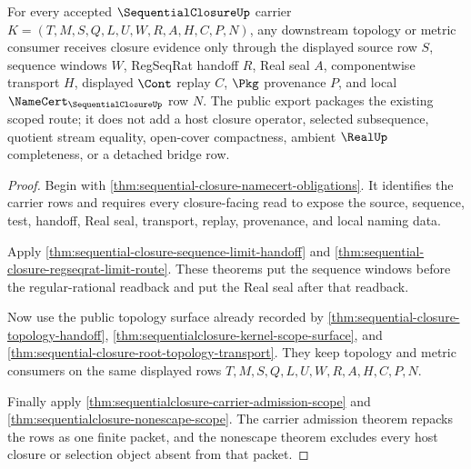 \begin{theorem}\label{thm:sequentialclosure-public-export}
For every accepted $\SequentialClosureUp$ carrier $K=(T,M,S,Q,L,U,W,R,A,H,C,P,N)$, any downstream topology or metric consumer receives closure evidence only through the displayed source row $S$, sequence windows $W$, RegSeqRat handoff $R$, Real seal $A$, componentwise transport $H$, displayed $\Cont$ replay $C$, $\Pkg$ provenance $P$, and local $\NameCert_{\SequentialClosureUp}$ row $N$. The public export packages the existing scoped route; it does not add a host closure operator, selected subsequence, quotient stream equality, open-cover compactness, ambient $\RealUp$ completeness, or a detached bridge row.
\end{theorem}
\begin{proof}
Begin with \autoref{thm:sequential-closure-namecert-obligations}. It identifies the carrier rows and requires every closure-facing read to expose the source, sequence, test, handoff, Real seal, transport, replay, provenance, and local naming data.

Apply \autoref{thm:sequential-closure-sequence-limit-handoff} and \autoref{thm:sequential-closure-regseqrat-limit-route}. These theorems put the sequence windows before the regular-rational readback and put the Real seal after that readback.

Now use the public topology surface already recorded by \autoref{thm:sequential-closure-topology-handoff}, \autoref{thm:sequentialclosure-kernel-scope-surface}, and \autoref{thm:sequential-closure-root-topology-transport}. They keep topology and metric consumers on the same displayed rows $T,M,S,Q,L,U,W,R,A,H,C,P,N$.

Finally apply \autoref{thm:sequentialclosure-carrier-admission-scope} and \autoref{thm:sequentialclosure-nonescape-scope}. The carrier admission theorem repacks the rows as one finite packet, and the nonescape theorem excludes every host closure or selection object absent from that packet.
\end{proof}

